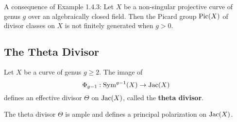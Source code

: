 \documentclass[12pt]{article}
\begin{document}
\begin{proposition}
    A consequence of Example 1.4.3: Let $X$ be a non-singular projective curve of genus $g$ over an algebraically closed field. Then the Picard group $\operatorname{Pic}(X)$ of divisor classes on $X$ is not finitely generated when $g > 0$.
\end{proposition}

\subsection{The Theta Divisor}

\begin{definition}
    Let $X$ be a curve of genus $g \geq 2$. The image of \[\Phi_{g-1}: \operatorname{Sym}^{g-1}(X) \to \operatorname{Jac}(X)\] defines an effective divisor $\Theta$ on $\operatorname{Jac}(X)$, called the \textbf{theta divisor}.
\end{definition}

\begin{theorem}
    The theta divisor $\Theta$ is ample and defines a principal polarization on $\operatorname{Jac}(X)$.
\end{theorem}
\end{document}
